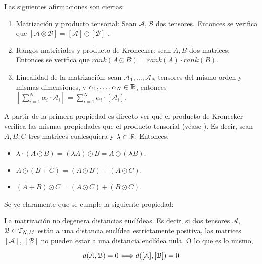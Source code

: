 \begin{proposicion} Las siguientes afirmaciones son ciertas:

    \begin{enumerate}
        \item Matrización y producto tensorial: Sean $\mathcal{A}, \mathcal{B}$ dos tensores. Entonces se verifica que $[\mathcal{A} \otimes \mathcal{B}] = [\mathcal{A}] \odot [\mathcal{B}]$ \label{prop:prop_fundamentales_primera}.
        \item Rangos matriciales y producto de Kronecker: sean $A, B$ dos matrices. Entonces se verifica que $rank(A \odot B) = rank(A) \cdot rank(B)$.
        \item Linealidad de la matrización: sean $\mathcal{A}_1, \ldots, \mathcal{A}_N$ tensores del mismo orden y mismas dimensiones, y $\alpha_1, \ldots, \alpha_N \in \mathbb{R}$, entonces $[\sum_{i = 1}^N \alpha_i \cdot \mathcal{A}_i] = \sum_{i = 1}^N \alpha_i \cdot [\mathcal{A}_i]$.
    \end{enumerate}

\end{proposicion}

\begin{observacion} A partir de la primera propiedad es directo ver que el producto de Kronecker verifica las mismas propiedades que el producto tensorial (véase ). Es decir, sean $A, B, C$ tres matrices cualesquiera y $\lambda \in \mathbb{R}$. Entonces:

\begin{itemize}
    \item $\lambda \cdot (A \odot B) = (\lambda A) \odot B = A \odot (\lambda B)$.
    \item $A \odot (B + C) = (A \odot B) + (A \odot C)$.
    \item $(A + B) \odot C = (A \odot C) + (B \odot C)$.
\end{itemize}

\end{observacion}

Se ve claramente que se cumple la siguiente propiedad:

\begin{proposicion} \label{prop:matrizacion_no_degenera_distancias}
    La matrización no degenera distancias euclídeas. Es decir, si dos tensores $\mathcal{A}$, $\mathcal{B} \in \mathcal{T}_{N, M}$ están a una distancia euclídea estrictamente positiva, las matrices $[\mathcal{A}]$, $[\mathcal{B}]$ no pueden estar a una distancia euclídea nula. O lo que es lo mismo,

    \begin{equation}
        d(\mathcal{A}, \mathcal{B}) = 0 \Longleftrightarrow d([\mathcal{A}], [\mathcal{B}]) = 0
    \end{equation}
\end{proposicion}

